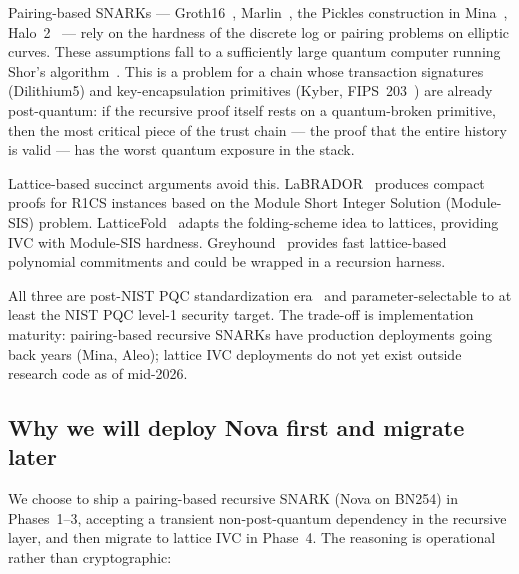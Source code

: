 \documentclass[11pt,a4paper]{article}
\begin{document}
Pairing-based SNARKs --- Groth16~\cite{Groth16},
Marlin~\cite{Marlin}, the Pickles construction in Mina~\cite{MinaPickles},
Halo~2~\cite{Halo2} --- rely on the hardness of the discrete log
or pairing problems on elliptic curves. These assumptions fall to a
sufficiently large quantum computer running Shor's algorithm~\cite{Shor1994}.
This is a problem for a chain whose transaction signatures
(Dilithium5) and key-encapsulation primitives (Kyber, FIPS~203~\cite{FIPS203}) are
already post-quantum: if the recursive proof itself rests on a quantum-broken
primitive, then the most critical piece of the trust chain --- the proof
that the entire history is valid --- has the worst quantum exposure in the
stack.

Lattice-based succinct arguments avoid this. LaBRADOR~\cite{BeullensSeiler2023LaBRADOR}
produces compact proofs for R1CS instances based on the Module Short Integer
Solution (Module-SIS) problem. LatticeFold~\cite{BonehChenTairi2024LatticeFold}
adapts the folding-scheme idea to lattices, providing IVC with Module-SIS
hardness. Greyhound~\cite{NguyenSeiler2024Greyhound} provides fast lattice-based
polynomial commitments and could be wrapped in a recursion harness.

All three are post-NIST PQC standardization era~\cite{NISTPQC2022} and
parameter-selectable to at least the NIST PQC level-1 security target.
The trade-off is implementation maturity: pairing-based recursive SNARKs
have production deployments going back years (Mina, Aleo); lattice IVC
deployments do not yet exist outside research code as of mid-2026.

\subsection{Why we will deploy Nova first and migrate later}

We choose to ship a pairing-based recursive SNARK (Nova on BN254) in
Phases~1--3, accepting a transient non-post-quantum dependency in the
recursive layer, and then migrate to lattice IVC in Phase~4. The reasoning is
operational rather than cryptographic:
\end{document}
